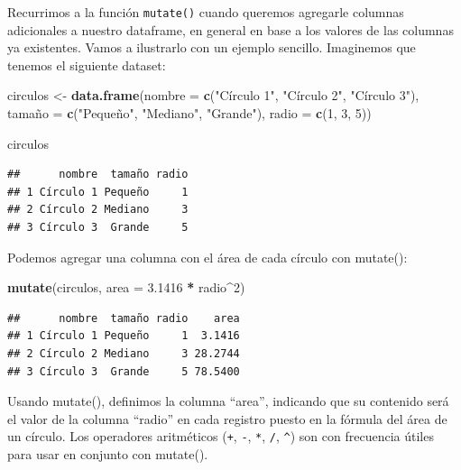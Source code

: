 \documentclass[]{book}
\newenvironment{Shaded}{\begin{snugshade}}{\end{snugshade}}
\newcommand{\KeywordTok}[1]{\textcolor[rgb]{0.13,0.29,0.53}{\textbf{#1}}}
\newcommand{\DataTypeTok}[1]{\textcolor[rgb]{0.13,0.29,0.53}{#1}}
\newcommand{\DecValTok}[1]{\textcolor[rgb]{0.00,0.00,0.81}{#1}}
\newcommand{\FloatTok}[1]{\textcolor[rgb]{0.00,0.00,0.81}{#1}}
\newcommand{\StringTok}[1]{\textcolor[rgb]{0.31,0.60,0.02}{#1}}
\newcommand{\OperatorTok}[1]{\textcolor[rgb]{0.81,0.36,0.00}{\textbf{#1}}}
\newcommand{\NormalTok}[1]{#1}
\begin{document}
Recurrimos a la función \texttt{mutate()} cuando queremos agregarle
columnas adicionales a nuestro dataframe, en general en base a los
valores de las columnas ya existentes. Vamos a ilustrarlo con un ejemplo
sencillo. Imaginemos que tenemos el siguiente dataset:

\begin{Shaded}
\begin{Highlighting}[]
\NormalTok{circulos <-}\StringTok{ }\KeywordTok{data.frame}\NormalTok{(}\DataTypeTok{nombre =} \KeywordTok{c}\NormalTok{(}\StringTok{"Círculo 1"}\NormalTok{, }\StringTok{"Círculo 2"}\NormalTok{, }\StringTok{"Círculo 3"}\NormalTok{),}
\NormalTok{                       tamañ}\DataTypeTok{o =} \KeywordTok{c}\NormalTok{(}\StringTok{"Pequeño"}\NormalTok{, }\StringTok{"Mediano"}\NormalTok{, }\StringTok{"Grande"}\NormalTok{),}
                       \DataTypeTok{radio  =} \KeywordTok{c}\NormalTok{(}\DecValTok{1}\NormalTok{, }\DecValTok{3}\NormalTok{, }\DecValTok{5}\NormalTok{))}

\NormalTok{circulos}
\end{Highlighting}
\end{Shaded}

\begin{verbatim}
##      nombre  tamaño radio
## 1 Círculo 1 Pequeño     1
## 2 Círculo 2 Mediano     3
## 3 Círculo 3  Grande     5
\end{verbatim}

Podemos agregar una columna con el área de cada círculo con mutate():

\begin{Shaded}
\begin{Highlighting}[]
\KeywordTok{mutate}\NormalTok{(circulos, }\DataTypeTok{area =} \FloatTok{3.1416} \OperatorTok{*}\StringTok{ }\NormalTok{radio}\OperatorTok{^}\DecValTok{2}\NormalTok{)}
\end{Highlighting}
\end{Shaded}

\begin{verbatim}
##      nombre  tamaño radio    area
## 1 Círculo 1 Pequeño     1  3.1416
## 2 Círculo 2 Mediano     3 28.2744
## 3 Círculo 3  Grande     5 78.5400
\end{verbatim}

Usando mutate(), definimos la columna ``area'', indicando que su
contenido será el valor de la columna ``radio'' en cada registro puesto
en la fórmula del área de un círculo. Los operadores aritméticos
(\texttt{+}, \texttt{-}, \texttt{*}, \texttt{/}, \texttt{\^{}}) son con
frecuencia útiles para usar en conjunto con mutate().
\end{document}
